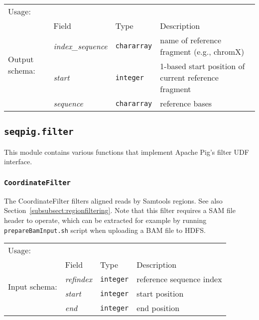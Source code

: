 \begin{tabular}{lp{}p{}p{}}
Usage: & \multicolumn{3}{l}{}
\hspace*{-0.55cm}\begin{minipage}{0.7\textwidth}
  \begin{lstlisting}
  reference_bases = load 'hg19.fa' using FastaLoader();
  \end{lstlisting}
  \end{minipage}\hfill\kern-\arrayrulewidth
 \\[0.25cm]
\multirow{4}{*}{Output schema:} & Field & Type & Description\\[0.1cm]
& \emph{index\_sequence} & \texttt{chararray} & name of reference fragment (e.g., chromX)\\
& \emph{start} & \texttt{integer} & 1-based start position of current reference fragment\\
& \emph{sequence} & \texttt{chararray} & reference bases
\end{tabular}

\subsection{\texttt{seqpig.filter}}

This module contains various functions that implement Apache Pig's
filter UDF interface.

\subsubsection{\texttt{CoordinateFilter}}

The CoordinateFilter filters aligned reads by Samtools regions. See
also Section~\ref{subsubsect:regionfiltering}. Note that this filter
requires a SAM file header to operate, which can be extracted for
example by running {\tt prepareBamInput.sh} script when uploading a
BAM file to HDFS.

\begin{tabular}{lp{}p{}p{}}
Usage: & \multicolumn{3}{l}{}
\hspace*{-0.55cm}\begin{minipage}{0.85\textwidth}
  \begin{lstlisting}
  DEFINE myFilter CoordinateFilter('input.bam.asciiheader','20:1-44350673');
  reads = load 'input.bam' using BamLoader('yes');
  reads = FILTER reads BY myFilter(refindex,start,end);
  \end{lstlisting}
  \end{minipage}\hfill\kern-\arrayrulewidth
 \\[0.25cm]
\multirow{4}{*}{Input schema:} & Field & Type & Description\\[0.1cm]
& \emph{refindex} & \texttt{integer} & reference sequence index\\
& \emph{start} & \texttt{integer} & start position\\
& \emph{end} & \texttt{integer} & end position
\end{tabular}

